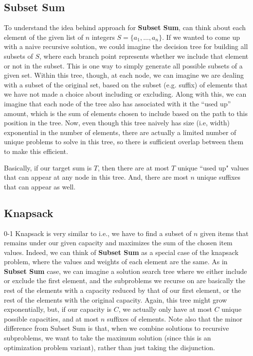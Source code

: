 \documentclass[10pt,a4paper]{article}
\begin{document}
\subsection*{Subset Sum}
\label{sec:subset-sum}

To understand the idea behind approach for \textbf{Subset Sum}, can think about each element of the given list of $n$ integers $S=\{a_1,\dots,a_n\}$. If we wanted to come up with a naive recursive solution, we could imagine the decision tree for building all subsets of $S$, where each branch point represents whether we include that element or not in the subset. This is one way to simply generate all possible subsets of a given set. Within this tree, though, at each node, we can imagine we are dealing with a subset of the original set, based on the subset (e.g. suffix) of elements that we have not made a choice about including or excluding. Along with this, we can imagine that each node of the tree also has associated with it the ``used up'' amount, which is the sum of elements chosen to include based on the path to this position in the tree. Now, even though this tree naively has size (i.e, width) exponential in the number of elements, there are actually a limited number of unique problems to solve in this tree, so there is sufficient overlap between them to make this efficient.

Basically, if our target sum is $T$, then there are at most $T$ unique ``used up" values that can appear at any node in this tree. And, there are most $n$ unique suffixes that can appear as well.


\subsection*{Knapsack}

0-1 Knapsack is very similar to  i.e., we have to find a subset of $n$ given items that remains under our given capacity and maximizes the sum of the chosen item values. Indeed, we can think of \textbf{Subset Sum} as a special case of the knapsack problem, where the values and weights of each element are the same. As in \textbf{Subset Sum} case, we can imagine a solution search tree where we either include or exclude the first element, and the subproblems we recurse on are basically the rest of the elements with a capacity reduced by that of our first element, or the rest of the elements with the original capacity. Again, this tree might grow exponentially, but, if our capacity is $C$, we actually only have at most $C$ unique possible capacities, and at most $n$ suffixes of elements. Note also that the minor difference from Subset Sum is that, when we combine solutions to recursive subproblems, we want to take the maximum solution (since this is an optimization problem variant), rather than just taking the disjunction.
\end{document}
